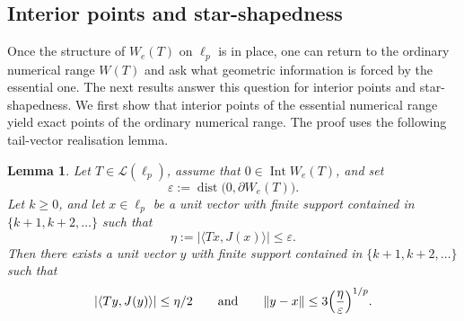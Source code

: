\documentclass[11pt]{amsart}
\numberwithin{equation}{section}
\newtheorem{lemma}[theorem]{Lemma}
\theoremstyle{definition}
\theoremstyle{remark}
\DeclareMathOperator{\Int}{Int}
\DeclareMathOperator{\dist}{dist}
\newcommand{\ip}[2]{\langle #1,#2\rangle}
\newcommand{\We}{W_e}
\begin{document}
\subsection{Interior points and star-shapedness}

Once the structure of $\We(T)$ on $\ell_p$ is in place, one can return to the ordinary numerical range $W(T)$ and ask what geometric information is forced by the essential one. The next results answer this question for interior points and star-shapedness.  We first show that interior points of the essential numerical range yield exact points of the ordinary numerical range.  The proof uses the following tail-vector realisation lemma.

\begin{lemma}\label{lem:interior-halving}
Let $T\in \mathcal L(\ell_p)$, assume that $0\in \Int \We(T)$, and set
\[
\varepsilon:=\dist\bigl(0,\partial \We(T)\bigr).
\]
Let $k\ge 0$, and let $x\in \ell_p$ be a unit vector with finite support contained in $\{k+1,k+2,\dots\}$ such that
\[
\eta:=|\ip{Tx}{J(x)}|\le \varepsilon.
\]
Then there exists a unit vector $y$ with finite support contained in $\{k+1,k+2,\dots\}$ such that
\[
|\ip{Ty}{J(y)}|\le \eta/2
\qquad\text{and}\qquad
\|y-x\|\le 3\Bigl(\frac{\eta}{\varepsilon}\Bigr)^{1/p}.
\]
\end{lemma}
\end{document}
